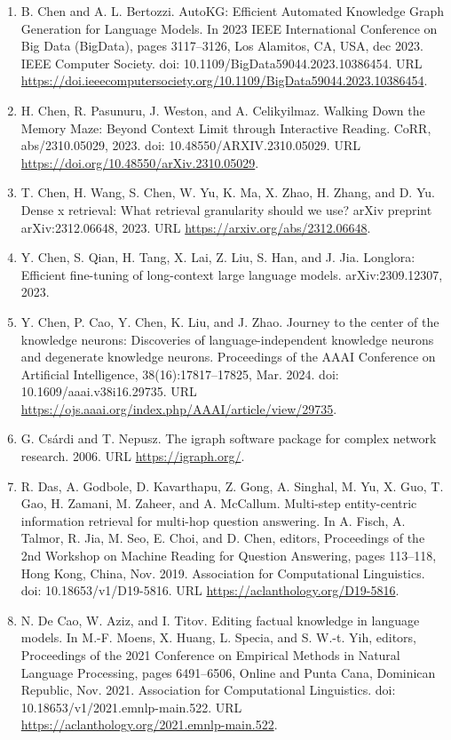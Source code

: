 \documentclass[11pt,UTF8,fontset=fandol]{ctexart}
\begin{document}
\begin{enumerate}[leftmargin=2em]
\item B. Chen and A. L. Bertozzi. AutoKG: Efficient Automated Knowledge Graph Generation for Language Models. In 2023 IEEE International Conference on Big Data (BigData), pages 3117--3126, Los Alamitos, CA, USA, dec 2023. IEEE Computer Society. doi: 10.1109/BigData59044.2023.10386454. URL \url{https://doi.ieeecomputersociety.org/10.1109/BigData59044.2023.10386454}.
\item H. Chen, R. Pasunuru, J. Weston, and A. Celikyilmaz. Walking Down the Memory Maze: Beyond Context Limit through Interactive Reading. CoRR, abs/2310.05029, 2023. doi: 10.48550/ARXIV.2310.05029. URL \url{https://doi.org/10.48550/arXiv.2310.05029}.
\item T. Chen, H. Wang, S. Chen, W. Yu, K. Ma, X. Zhao, H. Zhang, and D. Yu. Dense x retrieval: What retrieval granularity should we use? arXiv preprint arXiv:2312.06648, 2023. URL \url{https://arxiv.org/abs/2312.06648}.
\item Y. Chen, S. Qian, H. Tang, X. Lai, Z. Liu, S. Han, and J. Jia. Longlora: Efficient fine-tuning of long-context large language models. arXiv:2309.12307, 2023.
\item Y. Chen, P. Cao, Y. Chen, K. Liu, and J. Zhao. Journey to the center of the knowledge neurons: Discoveries of language-independent knowledge neurons and degenerate knowledge neurons. Proceedings of the AAAI Conference on Artificial Intelligence, 38(16):17817--17825, Mar. 2024. doi: 10.1609/aaai.v38i16.29735. URL \url{https://ojs.aaai.org/index.php/AAAI/article/view/29735}.
\item G. Cs\'ardi and T. Nepusz. The igraph software package for complex network research. 2006. URL \url{https://igraph.org/}.
\item R. Das, A. Godbole, D. Kavarthapu, Z. Gong, A. Singhal, M. Yu, X. Guo, T. Gao, H. Zamani, M. Zaheer, and A. McCallum. Multi-step entity-centric information retrieval for multi-hop question answering. In A. Fisch, A. Talmor, R. Jia, M. Seo, E. Choi, and D. Chen, editors, Proceedings of the 2nd Workshop on Machine Reading for Question Answering, pages 113--118, Hong Kong, China, Nov. 2019. Association for Computational Linguistics. doi: 10.18653/v1/D19-5816. URL \url{https://aclanthology.org/D19-5816}.
\item N. De Cao, W. Aziz, and I. Titov. Editing factual knowledge in language models. In M.-F. Moens, X. Huang, L. Specia, and S. W.-t. Yih, editors, Proceedings of the 2021 Conference on Empirical Methods in Natural Language Processing, pages 6491--6506, Online and Punta Cana, Dominican Republic, Nov. 2021. Association for Computational Linguistics. doi: 10.18653/v1/2021.emnlp-main.522. URL \url{https://aclanthology.org/2021.emnlp-main.522}.

\end{enumerate}
\end{document}
